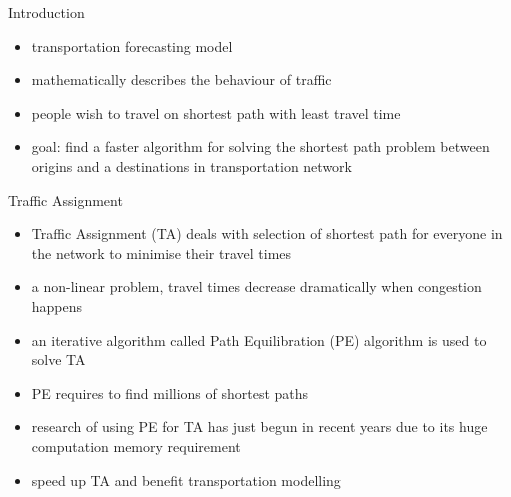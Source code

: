 \documentclass[final]{beamer}
\begin{document}
\begin{frame}{ }
    \begin{columns}[t]
        \begin{column}{.28\linewidth}

            \begin{block}{Introduction}
                \begin{itemize}
                    \item transportation forecasting model
                    \item mathematically describes the behaviour of traffic
                    \item people wish to travel on shortest path with least travel time
                    \item \alert{goal}: find a \alert{faster} algorithm for solving the \alert{shortest path} problem between origins and a destinations in transportation network
                \end{itemize}
            \end{block}

            \begin{block}{Traffic Assignment}
                \begin{itemize}
                    \item \alert{Traffic Assignment (TA)} deals with selection of \alert{shortest path} for everyone in the network to \alert{minimise} their \alert{travel times}
                    \item a \alert{non-linear} problem, travel times decrease dramatically when \alert{congestion} happens
                    \item an \alert{iterative algorithm} called \alert{Path Equilibration (PE)} algorithm is used to solve TA
                    \item \alert{PE} requires to find \alert{millions} of \alert{shortest paths}
                    \item research of using PE for TA has just begun in recent years due to its \alert{huge} computation \alert{memory} requirement
                    \item speed up TA and benefit transportation modelling
                \end{itemize}
            \end{block}

            \begin{block}{}
            \end{block}


\end{column}
\end{columns}
\end{frame}
\end{document}
